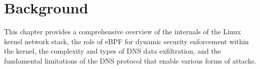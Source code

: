 \documentclass [11pt, proquest] {uwthesis}[2020/02/24]
\begin{document}

\chapter {Background}
This chapter provides a comprehensive overview of the internals of the Linux kernel network stack, the role of eBPF for dynamic security enforcement within the kernel, the complexity and types of DNS data exfiltration, and the fundamental limitations of the DNS protocol that enable various forms of attacks.
\end{document}
